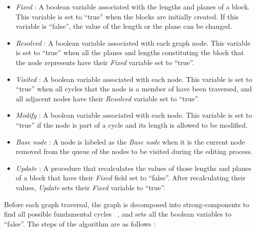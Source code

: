 	\begin{itemize}
	\item
	{\em Fixed} : A boolean variable associated with the lengths and planes of
	a block. This variable is set to ``true'' when the blocks are initially
	created. If this variable is ``false'', the value of the length or the plane
	can be changed.
	\item
	{\em Resolved} : A boolean variable associated with each graph node. This
	variable is set to ``true'' when all the planes and lengths constituting
	the block that the node represents have their {\em Fixed} variable
	set to ``true''.
	\item
	{\em Visited} : A boolean variable associated with each node. This variable
	is set to ``true'' when all cycles that the node is a member of have been
	traversed, and all adjacent nodes have their {\em Resolved} variable
	set to ``true''.
	\item
	{\em Modify} : A boolean variable associated with each node. This variable
	is set to ``true'' if the node is part of a cycle and its length is
	allowed to be modified.
	\item
	{\em Base node} : A node is labeled as the {\em Base node} when it is
	the current node removed from the queue of the nodes to be visited during
	the editing process.
	\item
	{\em Update} : A procedure that recalculates the values of those lengths
	and planes of a block that have their {\em Fixed} field set to ``false''.
	After recalculating their values, {\em Update} sets their {\em Fixed}
	variable to ``true''.
	\end{itemize}

	Before each graph traversal, the graph is decomposed into strong-components
	to find all possible fundamental cycles ~\cite{Rein}, and sets all the
	boolean variables to ``false''. The steps of the algorithm are as
	follows :

